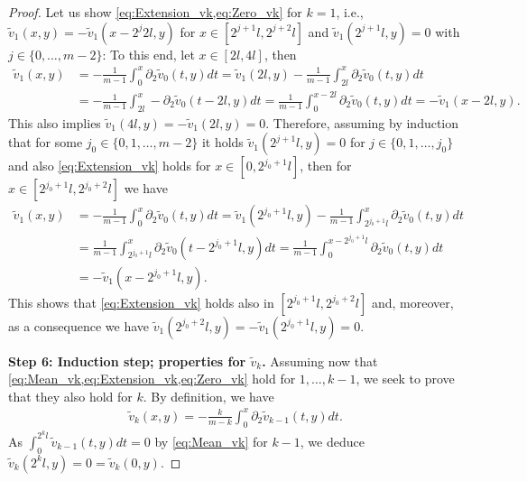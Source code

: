 \documentclass[a4paper, 10pt, twoside, notitlepage]{amsart}
\theoremstyle{plain}
\newcommand{\p}{\partial}
\begin{document}
\begin{proof}
                        
                          Let us show \cref{eq:Extension_vk,eq:Zero_vk} for $k=1$, i.e., $\tilde{v}_1(x,y) = - \tilde{v}_1(x-2^j 2l,y)$ for $x \in [2^{j+1}l,2^{j+2}l]$ and $\tilde{v}_1(2^{j+1}l,y)=0$ with $j\in\{0,\dots,m-2\}$:
                          To this end, let $x \in [2l,4l]$, then
                          \begin{align*}
                            \tilde{v}_1(x,y) & = -\frac{1}{m-1} \int_0^x \p_2 \tilde{v}_0(t,y) dt = \tilde{v}_1(2l,y) - \frac{1}{m-1}\int_{2l}^x \p_2 \tilde{v}_0(t,y) dt \\
                            &=-\frac{1}{m-1} \int_{2l}^x - \p_2 \tilde{v}_0(t-2l,y) dt = \frac{1}{m-1} \int_0^{x-2l} \p_2\tilde{v}_0(t,y) dt = - \tilde{v}_1(x-2l,y).
                          \end{align*}
                          This also implies $\tilde{v}_1(4l,y)=-\tilde{v}_1(2l,y)=0$.
                          Therefore, assuming by induction that for some $j_0 \in \{0,1,\dots,m-2\}$ it holds $\tilde{v}_1(2^{j+1}l,y)=0$ for $j\in\{0,1,\dots,j_0\}$ and also \cref{eq:Extension_vk} holds for $x\in[0,2^{j_0+1}l]$, then for $x \in [2^{j_0+1}l,2^{j_0+2}l]$ we have
                          \begin{align*}
                            \tilde{v}_1(x,y) &= - \frac{1}{m-1} \int_0^x \p_2 \tilde{v}_0(t,y) dt = \tilde{v}_1(2^{j_0+1}l,y) - \frac{1}{m-1} \int_{2^{j_0+1}l}^{x} \p_2 \tilde{v}_0(t,y) dt \\
                                             & = \frac{1}{m-1} \int_{2^{j_0+1}l}^{x} \p_2 \tilde{v}_0(t-2^{j_0+1}l,y) dt = \frac{1}{m-1} \int_0^{x-2^{j_0+1}l} \p_2 \tilde{v}_0(t,y) dt \\
                            & = -\tilde{v}_1(x-2^{j_0+1}l,y).
                          \end{align*}
                          This shows that \cref{eq:Extension_vk} holds also in $[2^{j_0+1}l,2^{j_0+2}l]$ and, moreover, as a consequence we have $\tilde{v}_{1}(2^{j_0+2}l,y) = -\tilde{v}_{1}(2^{j_0+1}l,y) = 0$.
                     
                          \textbf{Step 6: Induction step; properties for $\tilde{v}_k$.}
                          Assuming now that \cref{eq:Mean_vk,eq:Extension_vk,eq:Zero_vk} hold for $1,\dots,k-1$, we seek to prove that they also hold for $k$.
                          By definition, we have
                          \begin{align*}
                            \tilde{v}_k(x,y) = -\frac{k}{m-k} \int_0^x \p_2 \tilde{v}_{k-1}(t,y) dt.
                          \end{align*}
                          As $\int_0^{2^kl} \tilde{v}_{k-1}(t,y) dt = 0$ by \cref{eq:Mean_vk} for $k-1$, we deduce $\tilde{v}_k(2^kl,y) = 0 = \tilde{v}_k(0,y)$.                          
                        

\end{proof}
\end{document}
